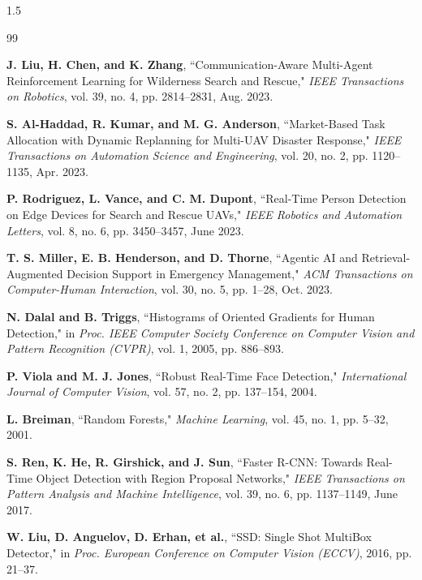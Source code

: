 \renewcommand{\bibname}{REFERENCES}
\cleardoublepage %
\begin{spacing}{1.5}
\begin{thebibliography}{99}

 \textbf{J. Liu, H. Chen, and K. Zhang}, ``Communication-Aware Multi-Agent Reinforcement Learning for Wilderness Search and Rescue," \textit{IEEE Transactions on Robotics}, vol. 39, no. 4, pp. 2814--2831, Aug. 2023.

 \textbf{S. Al-Haddad, R. Kumar, and M. G. Anderson}, ``Market-Based Task Allocation with Dynamic Replanning for Multi-UAV Disaster Response," \textit{IEEE Transactions on Automation Science and Engineering}, vol. 20, no. 2, pp. 1120--1135, Apr. 2023.

 \textbf{P. Rodriguez, L. Vance, and C. M. Dupont}, ``Real-Time Person Detection on Edge Devices for Search and Rescue UAVs," \textit{IEEE Robotics and Automation Letters}, vol. 8, no. 6, pp. 3450--3457, June 2023.

 \textbf{T. S. Miller, E. B. Henderson, and D. Thorne}, ``Agentic AI and Retrieval-Augmented Decision Support in Emergency Management," \textit{ACM Transactions on Computer-Human Interaction}, vol. 30, no. 5, pp. 1--28, Oct. 2023.

 \textbf{N. Dalal and B. Triggs}, ``Histograms of Oriented Gradients for Human Detection," in \textit{Proc. IEEE Computer Society Conference on Computer Vision and Pattern Recognition (CVPR)}, vol. 1, 2005, pp. 886--893.

 \textbf{P. Viola and M. J. Jones}, ``Robust Real-Time Face Detection," \textit{International Journal of Computer Vision}, vol. 57, no. 2, pp. 137--154, 2004.

 \textbf{L. Breiman}, ``Random Forests," \textit{Machine Learning}, vol. 45, no. 1, pp. 5--32, 2001.

 \textbf{S. Ren, K. He, R. Girshick, and J. Sun}, ``Faster R-CNN: Towards Real-Time Object Detection with Region Proposal Networks," \textit{IEEE Transactions on Pattern Analysis and Machine Intelligence}, vol. 39, no. 6, pp. 1137--1149, June 2017.

 \textbf{W. Liu, D. Anguelov, D. Erhan, et al.}, ``SSD: Single Shot MultiBox Detector," in \textit{Proc. European Conference on Computer Vision (ECCV)}, 2016, pp. 21--37.


\end{thebibliography}
\end{spacing}
